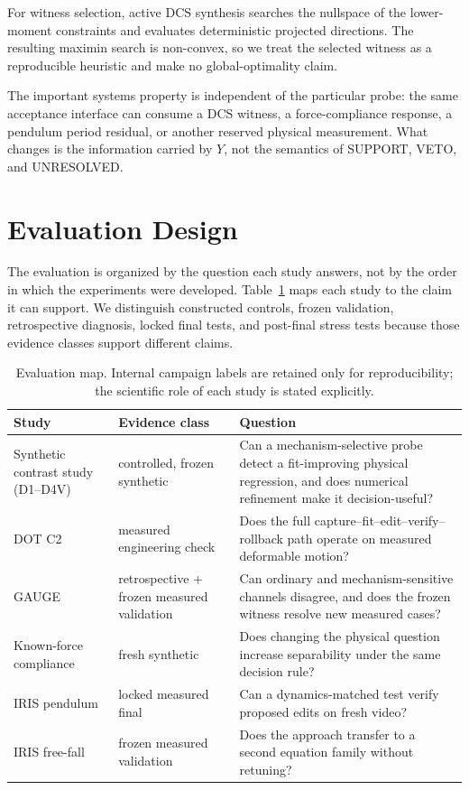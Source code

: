 \documentclass[acmtog]{acmart}
\begin{document}
For witness selection, active DCS synthesis searches the nullspace of the lower-moment constraints and evaluates deterministic projected directions. The resulting maximin search is non-convex, so we treat the selected witness as a reproducible heuristic and make no global-optimality claim.

The important systems property is independent of the particular probe: the same acceptance interface can consume a DCS witness, a force-compliance response, a pendulum period residual, or another reserved physical measurement. What changes is the information carried by \(Y\), not the semantics of SUPPORT, VETO, and UNRESOLVED.

\section{Evaluation Design}\label{experimental-program}

The evaluation is organized by the question each study answers, not by the order in which the experiments were developed. Table~\ref{tab:stages} maps each study to the claim it can support. We distinguish constructed controls, frozen validation, retrospective diagnosis, locked final tests, and post-final stress tests because those evidence classes support different claims.

\begin{table}[t]
\centering
\caption{Evaluation map. Internal campaign labels are retained only for reproducibility; the scientific role of each study is stated explicitly.}
\label{tab:stages}
\begin{tabularx}{\textwidth}{l l X}
\toprule
Study & Evidence class & Question \\
\midrule
Synthetic contrast study (D1--D4V) & controlled, frozen synthetic & Can a mechanism-selective probe detect a fit-improving physical regression, and does numerical refinement make it decision-useful? \\
DOT C2 \citep{li2025dot} & measured engineering check & Does the full capture--fit--edit--verify--rollback path operate on measured deformable motion? \\
GAUGE \citep{wang2026gauge} & retrospective + frozen measured validation & Can ordinary and mechanism-sensitive channels disagree, and does the frozen witness resolve new measured cases? \\
Known-force compliance & fresh synthetic & Does changing the physical question increase separability under the same decision rule? \\
IRIS pendulum \citep{khanbayov2026iris} & locked measured final & Can a dynamics-matched test verify proposed edits on fresh video? \\
IRIS free-fall \citep{khanbayov2026iris} & frozen measured validation & Does the approach transfer to a second equation family without retuning? \\
\bottomrule
\end{tabularx}
\end{table}
\end{document}
